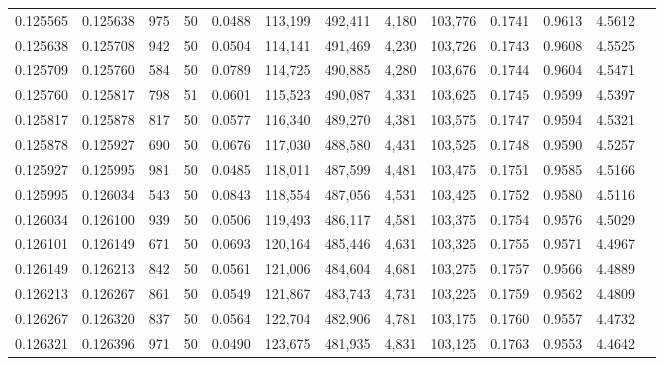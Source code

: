 \begin{tabular}{rrrrrrrrrrrrr}
0.125565 & 0.125638 &   975 &  50 &                                     0.0488 & 113,199 & 492,411 &   4,180 & 103,776 & 0.1741 & 0.9613 & 4.5612 \\
0.125638 & 0.125708 &   942 &  50 &                                     0.0504 & 114,141 & 491,469 &   4,230 & 103,726 & 0.1743 & 0.9608 & 4.5525 \\
0.125709 & 0.125760 &   584 &  50 &                                     0.0789 & 114,725 & 490,885 &   4,280 & 103,676 & 0.1744 & 0.9604 & 4.5471 \\
0.125760 & 0.125817 &   798 &  51 &                                     0.0601 & 115,523 & 490,087 &   4,331 & 103,625 & 0.1745 & 0.9599 & 4.5397 \\
0.125817 & 0.125878 &   817 &  50 &                                     0.0577 & 116,340 & 489,270 &   4,381 & 103,575 & 0.1747 & 0.9594 & 4.5321 \\
0.125878 & 0.125927 &   690 &  50 &                                     0.0676 & 117,030 & 488,580 &   4,431 & 103,525 & 0.1748 & 0.9590 & 4.5257 \\
0.125927 & 0.125995 &   981 &  50 &                                     0.0485 & 118,011 & 487,599 &   4,481 & 103,475 & 0.1751 & 0.9585 & 4.5166 \\
0.125995 & 0.126034 &   543 &  50 &                                     0.0843 & 118,554 & 487,056 &   4,531 & 103,425 & 0.1752 & 0.9580 & 4.5116 \\
0.126034 & 0.126100 &   939 &  50 &                                     0.0506 & 119,493 & 486,117 &   4,581 & 103,375 & 0.1754 & 0.9576 & 4.5029 \\
0.126101 & 0.126149 &   671 &  50 &                                     0.0693 & 120,164 & 485,446 &   4,631 & 103,325 & 0.1755 & 0.9571 & 4.4967 \\
0.126149 & 0.126213 &   842 &  50 &                                     0.0561 & 121,006 & 484,604 &   4,681 & 103,275 & 0.1757 & 0.9566 & 4.4889 \\
0.126213 & 0.126267 &   861 &  50 &                                     0.0549 & 121,867 & 483,743 &   4,731 & 103,225 & 0.1759 & 0.9562 & 4.4809 \\
0.126267 & 0.126320 &   837 &  50 &                                     0.0564 & 122,704 & 482,906 &   4,781 & 103,175 & 0.1760 & 0.9557 & 4.4732 \\
0.126321 & 0.126396 &   971 &  50 &                                     0.0490 & 123,675 & 481,935 &   4,831 & 103,125 & 0.1763 & 0.9553 & 4.4642 \\

\end{tabular}
